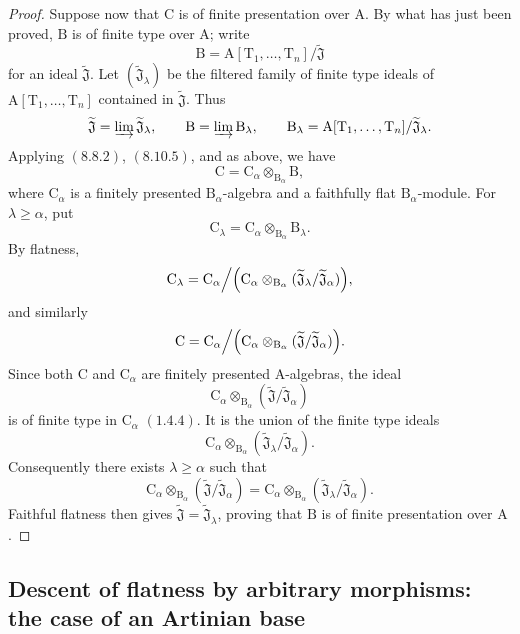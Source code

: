 \begin{proof}
Suppose now that $\mathrm{C}$ is of finite presentation over $\mathrm{A}$. By what has just been proved, $\mathrm{B}$ is of finite type over $\mathrm{A}$; write
\[
  \mathrm{B}
  =\mathrm{A}[\mathrm{T}_1,\ldots,\mathrm{T}_n]/\widetilde{\mathfrak{J}}
\]
for an ideal $\widetilde{\mathfrak{J}}$. Let $(\widetilde{\mathfrak{J}}_\lambda)$ be the filtered family of finite type ideals of $\mathrm{A}[\mathrm{T}_1,\ldots,\mathrm{T}_n]$ contained in $\widetilde{\mathfrak{J}}$. Thus
\[
  \widetilde{\mathfrak{J}}
  =\varinjlim\widetilde{\mathfrak{J}}_\lambda,
  \qquad
  \mathrm{B}
  =\varinjlim\mathrm{B}_\lambda,
  \qquad
  \mathrm{B}_\lambda
  =\mathrm{A}[\mathrm{T}_1,\ldots,\mathrm{T}_n]/
   \widetilde{\mathfrak{J}}_\lambda.
\]
Applying $(8.8.2)$, $(8.10.5)$, and  as above, we have
\[
  \mathrm{C}
  =\mathrm{C}_\alpha\otimes_{\mathrm{B}_\alpha}\mathrm{B},
\]
where $\mathrm{C}_\alpha$ is a finitely presented $\mathrm{B}_\alpha$-algebra and a faithfully flat $\mathrm{B}_\alpha$-module. For $\lambda\geqslant\alpha$, put
\[
  \mathrm{C}_\lambda
  =\mathrm{C}_\alpha\otimes_{\mathrm{B}_\alpha}\mathrm{B}_\lambda.
\]
By flatness,
\[
  \mathrm{C}_\lambda
  =
  \mathrm{C}_\alpha\Big/
  \Bigl(
    \mathrm{C}_\alpha\otimes_{\mathrm{B}_\alpha}
    (\widetilde{\mathfrak{J}}_\lambda/
     \widetilde{\mathfrak{J}}_\alpha)
  \Bigr),
\]
and similarly
\[
  \mathrm{C}
  =
  \mathrm{C}_\alpha\Big/
  \Bigl(
    \mathrm{C}_\alpha\otimes_{\mathrm{B}_\alpha}
    (\widetilde{\mathfrak{J}}/
     \widetilde{\mathfrak{J}}_\alpha)
  \Bigr).
\]
Since both $\mathrm{C}$ and $\mathrm{C}_\alpha$ are finitely presented $\mathrm{A}$-algebras, the ideal
\[
  \mathrm{C}_\alpha\otimes_{\mathrm{B}_\alpha}
  (\widetilde{\mathfrak{J}}/
   \widetilde{\mathfrak{J}}_\alpha)
\]
is of finite type in $\mathrm{C}_\alpha$ $(1.4.4)$. It is the union of the finite type ideals
\[
  \mathrm{C}_\alpha\otimes_{\mathrm{B}_\alpha}
  (\widetilde{\mathfrak{J}}_\lambda/
   \widetilde{\mathfrak{J}}_\alpha).
\]
Consequently there exists $\lambda\geqslant\alpha$ such that
\[
  \mathrm{C}_\alpha\otimes_{\mathrm{B}_\alpha}
  (\widetilde{\mathfrak{J}}/
   \widetilde{\mathfrak{J}}_\alpha)
  =
  \mathrm{C}_\alpha\otimes_{\mathrm{B}_\alpha}
  (\widetilde{\mathfrak{J}}_\lambda/
   \widetilde{\mathfrak{J}}_\alpha).
\]
Faithful flatness then gives
$\widetilde{\mathfrak{J}}=\widetilde{\mathfrak{J}}_\lambda$, proving that $\mathrm{B}$ is of finite presentation over $\mathrm{A}$.
\end{proof}

\subsection{Descent of flatness by arbitrary morphisms: the case of an Artinian base}
\label{subsection:IV.11.4}

